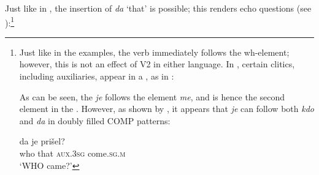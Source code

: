 \documentclass[output=paper,modfonts, hidelinks, newtxmath]{langscibook}
\begin{document}
  
Just like in , the insertion of \textit{da} `that' is possible; this renders echo questions (see \citealt{hladnik2010}):\footnote{Just like in the  examples, the verb immediately follows the wh-element; however, this is not an effect of V2 in either language. In , certain clitics, including auxiliaries, appear in a , as in :

\z

\noindent As can be seen, the  \textit{je} follows the element \textit{me}, and is hence the second element in the . However, as shown by , it appears that \textit{je} can follow both \textit{kdo} and \textit{da} in doubly filled COMP patterns:

\ea
	 {\normalfont da} {\normalfont je} {\normalfont pri\v{s}el?} \label{kdodaje}\\
			who that \textsc{aux.3sg} come.\textsc{sg.m}\\
	\glt `WHO came?'
\z

}
\end{document}
